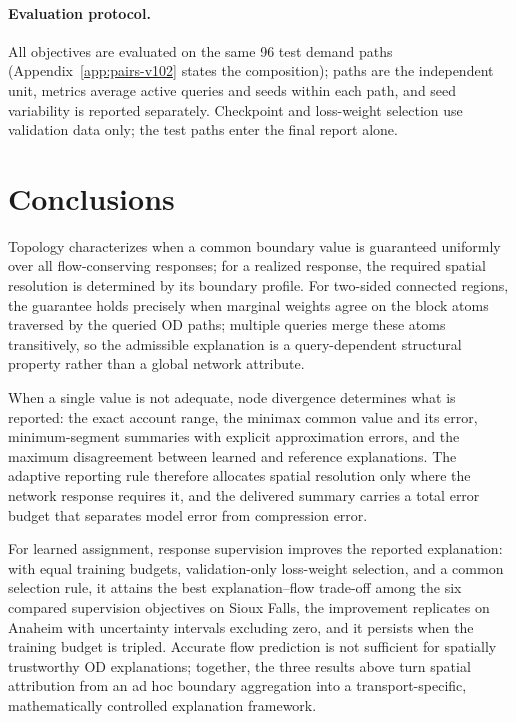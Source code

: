 \documentclass[a4paper,fleqn]{cas-sc}
\begin{document}
\paragraph{Evaluation protocol.}
All objectives are evaluated on the same 96 test demand paths
(Appendix~\ref{app:pairs-v102} states the composition); paths are
the independent unit, metrics average active queries and seeds within
each path, and seed variability is reported separately. Checkpoint and
loss-weight selection use validation data only; the test paths enter
the final report alone.



\section{Conclusions}\label{sec:conclusions}
Topology characterizes when a common boundary value is guaranteed
uniformly over all flow-conserving responses; for a realized response,
the required spatial resolution is determined by its boundary profile.
For two-sided connected regions, the guarantee holds precisely when
marginal weights agree on the block atoms traversed by the queried OD
paths; multiple queries merge these atoms transitively, so the
admissible explanation is a query-dependent structural property rather
than a global network attribute.

When a single value is not adequate, node divergence determines what is
reported: the exact account range, the minimax common value and its
error, minimum-segment summaries with explicit approximation errors,
and the maximum disagreement between learned and reference
explanations. The adaptive reporting rule therefore allocates spatial
resolution only where the network response requires it, and the
delivered summary carries a total error budget that separates model
error from compression error.

For learned assignment, response supervision improves the reported
explanation: with equal training budgets, validation-only loss-weight
selection, and a common selection rule, it attains the best
explanation--flow trade-off among the six compared supervision
objectives on Sioux Falls, the improvement replicates on Anaheim with
uncertainty intervals excluding zero, and it persists when the training
budget is tripled. Accurate flow prediction is not sufficient for
spatially trustworthy OD explanations; together, the three results
above turn spatial attribution from an ad hoc boundary aggregation into
a transport-specific, mathematically controlled explanation framework.
\end{document}
